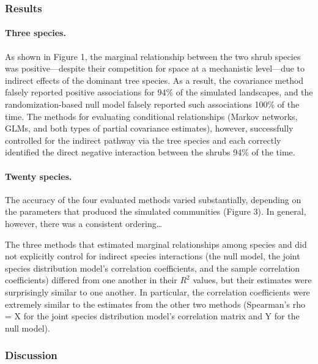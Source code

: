 \documentclass[12pt,]{article}
\begin{document}
\begin{spacing}{1.9}
\begin{flushleft}
\subsubsection{Results}\label{results}

\paragraph{Three species.}\label{three-species.}

As shown in Figure 1, the marginal relationship between the two shrub
species was positive---despite their competition for space at a
mechanistic level---due to indirect effects of the dominant tree
species. As a result, the covariance method falsely reported positive
associations for 94\% of the simulated landscapes, and the
randomization-based null model falsely reported such associations 100\%
of the time. The methods for evaluating conditional relationships
(Markov networks, GLMs, and both types of partial covariance estimates),
however, successfully controlled for the indirect pathway via the tree
species and each correctly identified the direct negative interaction
between the shrubs 94\% of the time.

\paragraph{Twenty species.}\label{twenty-species.}

The accuracy of the four evaluated methods varied substantially,
depending on the parameters that produced the simulated communities
(Figure 3). In general, however, there was a consistent ordering\ldots{}

The three methods that estimated marginal relationships among species
and did not explicitly control for indirect species interactions (the
null model, the joint species distribution model's correlation
coefficients, and the sample correlation coefficients) differed from one
another in their \(R^2\) values, but their estimates were surprisingly
similar to one another. In particular, the correlation coefficients were
extremely similar to the estimates from the other two methods
(Spearman's rho = X for the joint species distribution model's
correlation matrix and Y for the null model).

\subsubsection{Discussion}\label{discussion}


\end{flushleft}
\end{spacing}
\end{document}
